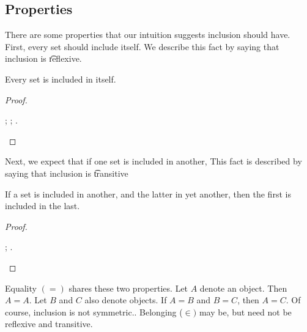 \subsection*{Properties}


There are some properties that our intuition suggests inclusion should have.
First, every set should include itself.
We describe this fact by saying that inclusion is \t{reflexive}.
\begin{proposition}[Reflexive]Every set is included in itself.\end{proposition}
\begin{proof}\begin{caccount}
;
;
.
\end{caccount}\end{proof}

Next, we expect that if one set is included in another,
This fact is described by saying that inclusion is \t{transitive}
\begin{proposition}[Transitive]If a set is included in another, and the latter in yet another, then the first is included in the last.\end{proposition}
\begin{proof}\begin{caccount}
;
.
\end{caccount}\end{proof}


Equality $(=)$ shares these two properties.
Let $A$ denote an object.
Then $A = A$.
Let $B$ and $C$ also denote objects.
If $A = B$ and $B = C$, then $A = C$.
Of course, inclusion is not symmetric..
Belonging ($\in)$ may be, but need not be reflexive and transitive.


